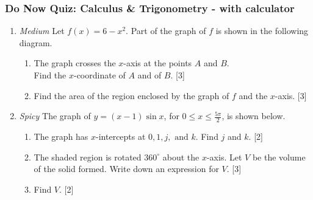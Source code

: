 \documentclass[12pt, twoside]{article}
\begin{document}
\subsubsection*{Do Now Quiz: Calculus \& Trigonometry - with calculator}
\begin{enumerate}
 \item \emph{Medium} Let $f(x)=6-x^2$. Part of the graph of $f$ is shown in the following diagram.
    \begin{center}
    \end{center}
  \begin{enumerate}
    \item The graph crosses the $x$-axis at the points $A$ and $B$.\\
    Find the $x$-coordinate of $A$ and of $B$. \hfill [3]
    \item Find the area of the region enclosed by the graph of $f$ and the $x$-axis.  \hfill [3]
  \end{enumerate}

\item \emph{Spicy} The graph of $y=(x-1)\sin x$, for $0 \leq x \leq \frac{5 \pi}{2}$, is shown below.
      \begin{center}
      \end{center}
      \begin{enumerate}
        \item The graph has $x$-intercepts at $0,1, j, \text{ and }k$.
          Find $j$ and $k$. \hfill [2]
        \item The shaded region is rotated $360^\circ$ about the $x$-axis. Let $V$ be the volume of the solid formed. %
        Write down an expression for $V$. \hfill [3]
        \item Find $V$.  \hfill [2]
        \end{enumerate}


\end{enumerate}
\end{document}
